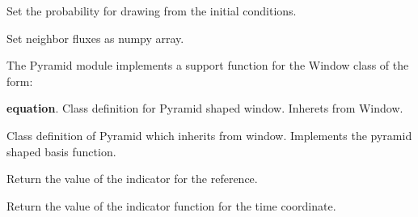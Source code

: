 \documentclass[letterpaper,10pt,english]{sphinxmanual}
\begin{document}
\begin{fulllineitems}
\begin{fulllineitems}
\end{fulllineitems}


\begin{fulllineitems}
\label{applications/applications.doc:window.window.set_initial_conditions_probability}
Set the probability for drawing from the initial conditions.

\end{fulllineitems}


\begin{fulllineitems}
\label{applications/applications.doc:window.window.update_fluxes}
Set neighbor fluxes as numpy array.

\end{fulllineitems}


\end{fulllineitems}


The Pyramid module implements a support function for the Window class of the form:

\textbf{equation}.
\label{applications/applications.doc:module-pyramid}
Class definition for Pyramid shaped window. Inherets from Window.

\begin{fulllineitems}
\label{applications/applications.doc:pyramid.Pyramid}
Class definition of Pyramid which inherits from window. Implements the pyramid shaped basis function.

\begin{fulllineitems}
\label{applications/applications.doc:pyramid.Pyramid.ref_indicator}
Return the value of the indicator for the reference.

\end{fulllineitems}


\begin{fulllineitems}
\label{applications/applications.doc:pyramid.Pyramid.time_indicator}
Return the value of the indicator function for the time coordinate.

\end{fulllineitems}


\end{fulllineitems}
\end{document}
